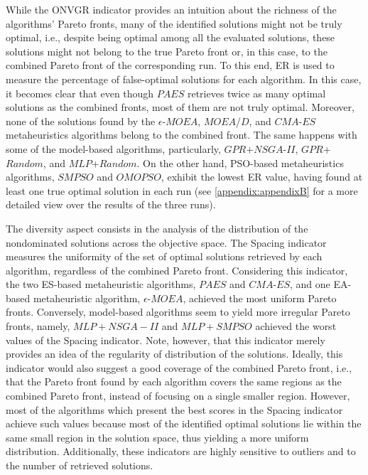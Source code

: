 While the \ac{ONVGR} indicator provides an intuition about the richness of the algorithms' Pareto fronts, many of the identified solutions might not be truly optimal, i.e., despite being optimal among all the evaluated solutions, these solutions might not belong to the true Pareto front or, in this case, to the combined Pareto front of the corresponding run. To this end, \ac{ER} is used to measure the percentage of false-optimal solutions for each algorithm. In this case, it becomes clear that even though $PAES$ retrieves twice as many optimal solutions as the combined fronts, most of them are not truly optimal. Moreover, none of the solutions found by the $\epsilon$-$MOEA$, $MOEA$/$D$, and $CMA$-$ES$ metaheuristics algorithms belong to the combined front. The same happens with some of the model-based algorithms, particularly, $GPR$+$NSGA$-$II$, $GPR$+$Random$, and $MLP$+$Random$. On the other hand, \ac{PSO}-based metaheuristics algorithms, $SMPSO$ and $OMOPSO$, exhibit the lowest \ac{ER} value, having found at least one true optimal solution in each run (see \cref{appendix:appendixB} for a more detailed view over the results of the three runs).

The diversity aspect consists in the analysis of the distribution of the nondominated solutions across the objective space. The Spacing indicator measures the uniformity of the set of optimal solutions retrieved by each algorithm, regardless of the combined Pareto front. Considering this indicator, the two \ac{ES}-based metaheuristic algorithms, $PAES$ and $CMA$-$ES$, and one \ac{EA}-based metaheuristic algorithm, $\epsilon$-$MOEA$, achieved the most uniform Pareto fronts. Conversely, model-based algorithms seem to yield more irregular Pareto fronts, namely, $MLP+NSGA-II$ and $MLP+SMPSO$ achieved the worst values of the Spacing indicator. Note, however, that this indicator merely provides an idea of the regularity of distribution of the solutions. Ideally, this indicator would also suggest a good coverage of the combined Pareto front, i.e., that the Pareto front found by each algorithm covers the same regions as the combined Pareto front, instead of focusing on a single smaller region. However, most of the algorithms which present the best scores in the Spacing indicator achieve such values because most of the identified optimal solutions lie within the same small region in the solution space, thus yielding a more uniform distribution. Additionally, these indicators are highly sensitive to outliers and to the number of retrieved solutions. %

